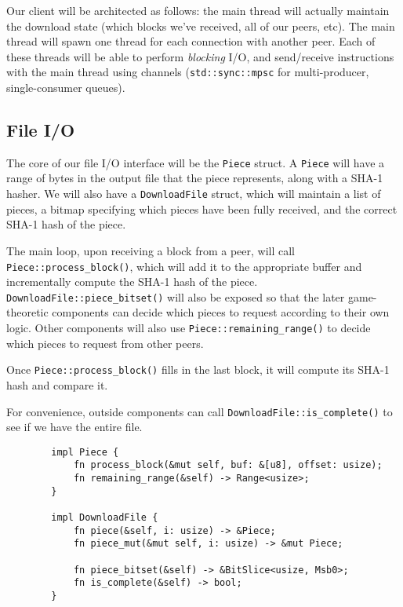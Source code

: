 \documentclass{article}
\begin{document}
    Our client will be architected as follows: the main thread will actually maintain the download state (which blocks we've received, all of our peers, etc).
    The main thread will spawn one thread for each connection with another peer.
    Each of these threads will be able to perform \emph{blocking} I/O, and send/receive instructions with the main thread using channels (\texttt{std::sync::mpsc} for multi-producer, single-consumer queues).

    \subsection{File I/O}

    The core of our file I/O interface will be the \verb|Piece| struct.
    A \verb|Piece| will have a range of bytes in the output file that the piece represents, along with a SHA-1 hasher.
    We will also have a \verb|DownloadFile| struct, which will maintain a list of pieces, a bitmap specifying which pieces have been fully received, and the correct SHA-1 hash of the piece.
    
    The main loop, upon receiving a block from a peer, will call \texttt{Piece::process\_block()}, which will add it to the appropriate buffer and incrementally compute the SHA-1 hash of the piece.
    \verb|DownloadFile::piece_bitset()| will also be exposed so that the later game-theoretic components can decide which pieces to request according to their own logic.
    Other components will also use \texttt{Piece::remaining\_range()} to decide which pieces to request from other peers.

    Once \verb|Piece::process_block()| fills in the last block, it will compute its SHA-1 hash and compare it.

    For convenience, outside components can call \verb|DownloadFile::is_complete()| to see if we have the entire file.

    \begin{verbatim}
        impl Piece {
            fn process_block(&mut self, buf: &[u8], offset: usize);
            fn remaining_range(&self) -> Range<usize>;
        }

        impl DownloadFile {
            fn piece(&self, i: usize) -> &Piece;
            fn piece_mut(&mut self, i: usize) -> &mut Piece;

            fn piece_bitset(&self) -> &BitSlice<usize, Msb0>;
            fn is_complete(&self) -> bool;
        }
    \end{verbatim}
\end{document}
